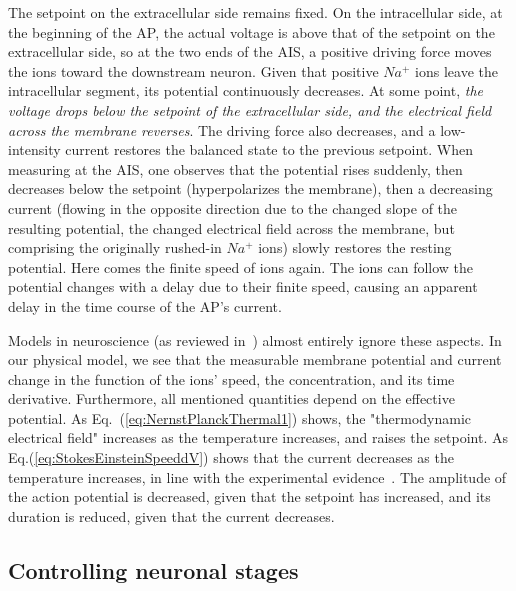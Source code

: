 The setpoint on the extracellular side remains fixed.
On the intracellular side, at the beginning of the \gls{AP}, the actual voltage 
is above that of the setpoint on the extracellular side, so at the two ends of the \gls{AIS}, a positive driving force moves the ions toward the downstream neuron. 
Given that positive $Na^+$ ions leave the intracellular segment, its potential continuously decreases. At some point, 
\textit{the voltage drops below the setpoint of the extracellular side,
	and the electrical field across the membrane reverses}. 
The driving force also decreases, and a low-intensity current
restores the balanced state to the previous setpoint.
When measuring at the \gls{AIS}, one observes that the
potential rises suddenly, then decreases below the setpoint (hyperpolarizes the membrane), then a decreasing current (flowing in the opposite direction due to the changed slope of the resulting potential, the changed electrical field across the membrane,
but comprising the originally rushed-in $Na^+$ ions) slowly restores the resting potential.
Here comes the finite speed of ions again. 
The ions can follow the potential changes with a delay
due to their finite speed, causing an apparent delay in the time course of the \gls{AP}'s current. 
\else

\fi

\ifx\magyar\undefined
Models in neuroscience (as reviewed in~\cite{BrainNetworkModels:2018})
almost entirely ignore these aspects. In our physical model, we see
that the measurable membrane potential and current change in the function
of the ions' speed, the concentration, and its time derivative.
Furthermore, all mentioned quantities depend on the effective potential. 
As Eq.~(\ref{eq:NernstPlanckThermal1}) shows, the "thermodynamic electrical field" increases
as the temperature increases, and raises the setpoint.  As Eq.(\ref{eq:StokesEinsteinSpeeddV})
shows that the current decreases as the temperature increases, in line with the experimental evidence~\cite{APTemperatureDependence:2012,APTemperatureDependence:1985}.
The amplitude of the action potential is decreased, given that the setpoint has increased, and its duration is reduced, given that the current decreases.

\else

\fi


\subsection[Controlling states]{Controlling neuronal stages\label{Physics-ControlTheory}}

